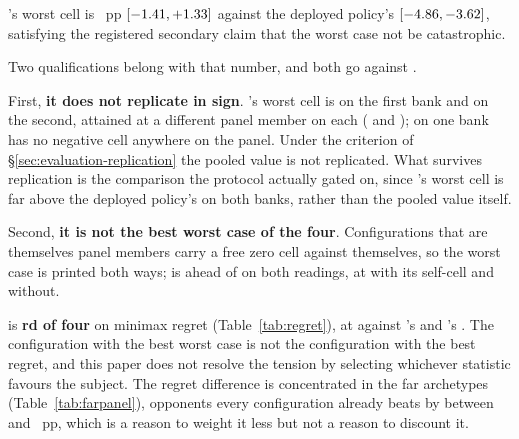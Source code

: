 \begin{table}[!ht]\centering
\caption{Worst panel cell per configuration. Per-bank values are given in bank order,
7090001 then 7090002.}
\label{tab:worstcase}
{\tabfont}
\end{table}

\sestina{}'s worst cell is \vsevenWorstFrozen{}~pp
$[-1.41, +1.33]$ against the deployed policy's \vsevenWorstIncumbent{}
$[-4.86, -3.62]$, satisfying the registered secondary claim that
the worst case not be catastrophic.

Two qualifications belong with that number, and both go against \sestina{}.

First, \textbf{it does not replicate in sign}. \sestina{}'s worst cell is
\vsevenWorstFrozenBankOne{} on the first bank and \vsevenWorstFrozenBankTwo{} on the second, attained
at a different panel member on each (\texttt{\vsevenWorstFrozenBankOneOpp{}} and
\texttt{\vsevenWorstFrozenBankTwoOpp{}}); on one bank \sestina{} has no negative cell anywhere on
the panel. Under the criterion of \S\ref{sec:evaluation-replication} the pooled value is not
replicated. What survives replication is the comparison the protocol actually gated on, since
\sestina{}'s worst cell is far above the deployed policy's on both banks, rather than the pooled
value itself.

Second, \textbf{it is not the best worst case of the four}. Configurations that are themselves panel
members carry a free zero cell against themselves, so the worst case is printed both ways;
\composite{} is ahead of \sestina{} on both readings, at \vsevenWorstComposite{} with its self-cell
and \vsevenWorstCompositeExSelf{} without.

\begin{table}[!ht]\centering
\caption{Minimax regret over the shared panel, best first. The protocol sets no threshold on this
quantity and requires only that it be reported.}
\label{tab:regret}
{\tabfont}
\end{table}

\sestina{} is \textbf{\vsevenRegretFrozenRank{}rd of four} on minimax regret (Table~\ref{tab:regret}), at
\vsevenRegretFrozen{} against \vsevenRegretBest{}'s \vsevenRegretFcheap{} and \composite{}'s
\vsevenRegretComposite{}. The configuration with the best worst case is not the configuration with the
best regret, and this paper does not resolve the tension by selecting whichever statistic favours the
subject. The regret difference is concentrated in the far archetypes (Table~\ref{tab:farpanel}),
opponents every configuration already beats by between \vsevenFarSpanLo{} and \vsevenFarSpanHi{}~pp,
which is a reason to weight it less but not a reason to discount it.

